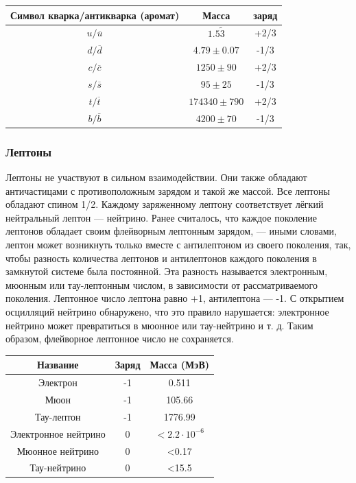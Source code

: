 \documentclass[a4paper,14pt]{article}
\begin{document}
\begin{center}
\begin{tabular}{|c|c|c|}
\hline
Символ кварка/антикварка (аромат)&Масса&заряд\\
\hline
$u/\overline{u}$&$1.5 \tilde 3$&+2/3\\
\hline
$d/\overline{d}$&$4.79 \pm 0.07$&-1/3\\
\hline
$c/\overline{c}$&$1250 \pm 90$&+2/3\\
\hline
$s/\overline{s}$&$95 \pm 25$&-1/3\\
\hline
$t/\overline{t}$&$174340 \pm 790$&+2/3\\
\hline
$b/\overline{b}$&$4200 \pm 70$&-1/3\\
\hline
\end{tabular}
\end{center}

\subsubsection*{Лептоны}

Лептоны не участвуют в сильном взаимодействии. Они также обладают античастицами с противоположным зарядом и такой же массой. Все лептоны обладают спином 1/2. Каждому заряженному лептону соответствует лёгкий нейтральный лептон — нейтрино. Ранее считалось, что каждое поколение лептонов обладает своим флейворным лептонным зарядом, — иными словами, лептон может возникнуть только вместе с антилептоном из своего поколения, так, чтобы разность количества лептонов и антилептонов каждого поколения в замкнутой системе была постоянной. Эта разность называется электронным, мюонным или тау-лептонным числом, в зависимости от рассматриваемого поколения. Лептонное число лептона равно +1, антилептона — -1. С открытием осцилляций нейтрино обнаружено, что это правило нарушается: электронное нейтрино может превратиться в мюонное или тау-нейтрино и т. д. Таким образом, флейворное лептонное число не сохраняется.

\begin{center}
\begin{tabular}{|c|c|c|}
\hline
Название&Заряд&Масса (МэВ)\\
\hline
Электрон&-1&0.511\\
\hline
Мюон&-1&105.66\\
\hline
Тау-лептон&-1&1776.99\\
\hline
Электронное нейтрино&0&$<2.2 \cdot 10^{-6}$\\
\hline
Мюонное нейтрино&0&<0.17\\
\hline
Тау-нейтрино&0&<15.5\\
\hline
\end{tabular}
\end{center}
\end{document}
